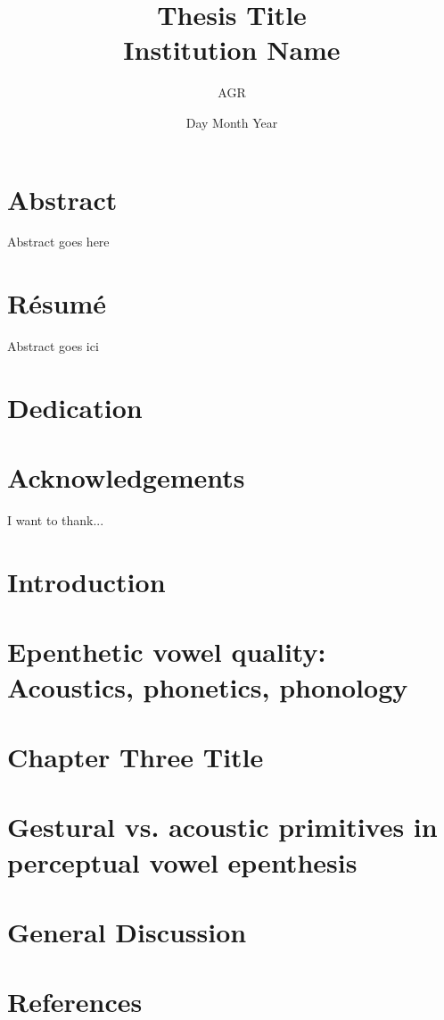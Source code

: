 \documentclass[12pt, twoside]{report}
\title{
	{Thesis Title}\\
	{\large Institution Name}\\
}
\author{AGR}
\date{Day Month Year}
\begin{document}
\maketitle

\chapter*{Abstract}
Abstract goes here

\chapter*{Résumé}
Abstract goes ici

\chapter*{Dedication}


\chapter*{Acknowledgements}
I want to thank...

\tableofcontents

\chapter{Introduction}


\chapter{{\color{red}Epenthetic vowel quality: Acoustics, phonetics, phonology}}


\chapter{Chapter Three Title}


\chapter{{\color{red}Gestural vs. acoustic primitives in perceptual vowel epenthesis}}

%

\chapter{General Discussion}


\appendix
\fancyhead{}
\fancyhead[RO,LE]{\nouppercase{\leftmark}}
\fancyfoot{}
\fancyfoot[LE,RO]{\thepage}


\chapter{References}


\end{document}
